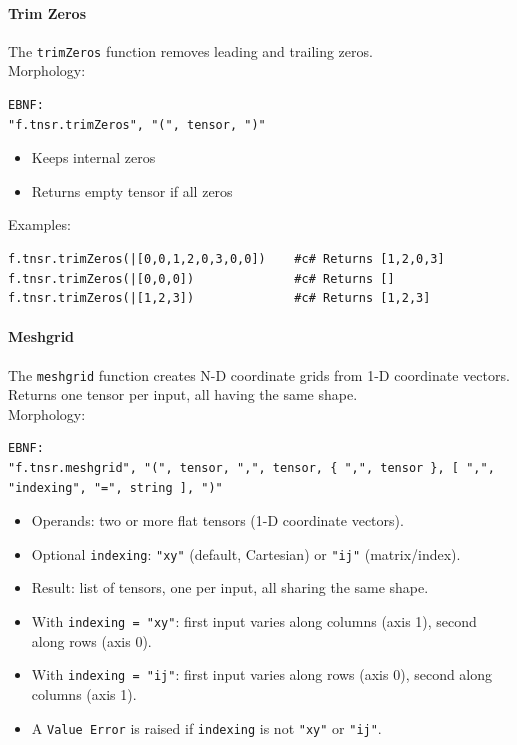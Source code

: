 \paragraph{Trim Zeros}
The \texttt{trimZeros} function removes leading and trailing zeros.\\
Morphology:
\begin{verbatim}
EBNF:
"f.tnsr.trimZeros", "(", tensor, ")"
\end{verbatim}
\begin{itemize}
\item Keeps internal zeros
\item Returns empty tensor if all zeros
\end{itemize}
Examples:
\begin{verbatim}
f.tnsr.trimZeros(|[0,0,1,2,0,3,0,0])    #c# Returns [1,2,0,3]
f.tnsr.trimZeros(|[0,0,0])              #c# Returns []
f.tnsr.trimZeros(|[1,2,3])              #c# Returns [1,2,3]
\end{verbatim}

\paragraph{Meshgrid}
The \texttt{meshgrid} function creates N-D coordinate grids from 1-D coordinate vectors. Returns one tensor per input, all having the same shape. \\ Morphology:
\begin{verbatim}
EBNF:
"f.tnsr.meshgrid", "(", tensor, ",", tensor, { ",", tensor }, [ ",", "indexing", "=", string ], ")"
\end{verbatim}
\begin{itemize}
\item Operands: two or more flat tensors (1-D coordinate vectors).
\item Optional \texttt{indexing}: \texttt{"xy"} (default, Cartesian) or \texttt{"ij"} (matrix/index).
\item Result: list of tensors, one per input, all sharing the same shape.
\item With \texttt{indexing = "xy"}: first input varies along columns (axis 1), second along rows (axis 0).
\item With \texttt{indexing = "ij"}: first input varies along rows (axis 0), second along columns (axis 1).
\item A \texttt{Value Error} is raised if \texttt{indexing} is not \texttt{"xy"} or \texttt{"ij"}.
\end{itemize}

